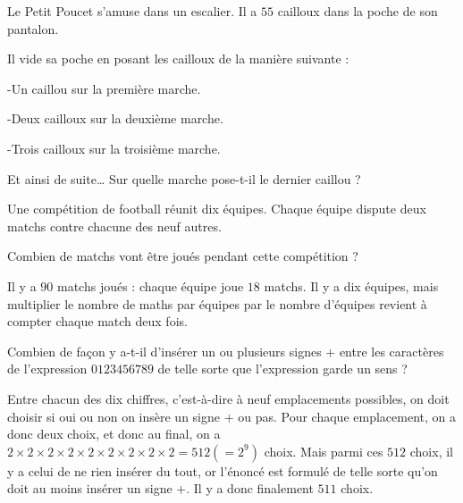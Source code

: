 \begin{exo}
Le Petit Poucet s’amuse dans un escalier. Il a $55$ cailloux dans la poche de son pantalon.

Il vide sa poche en posant les cailloux de la manière suivante :

-Un caillou sur la première marche.

-Deux cailloux sur la deuxième marche.

-Trois cailloux sur la troisième marche.

Et ainsi de suite… Sur quelle marche pose-t-il le dernier caillou ?
\end{exo}

\begin{exo}
Une compétition de football réunit dix équipes. Chaque équipe dispute deux matchs contre chacune des neuf autres.

Combien de matchs vont être joués pendant cette compétition ?
\begin{sol}
Il y a $90$ matchs joués : chaque équipe joue $18$ matchs. Il y a dix équipes, mais multiplier le nombre de maths par équipes par le nombre d'équipes revient à compter chaque match deux fois.
\end{sol} 
\end{exo}



\begin{exo}
Combien de façon y a-t-il d'insérer un ou plusieurs signes $+$ entre les caractères de l'expression $0123456789$ de telle sorte que l'expression garde un sens ?
\begin{sol}
Entre chacun des dix chiffres, c'est-à-dire à neuf emplacements possibles, on doit choisir si oui ou non on insère un signe $+$ ou pas. Pour chaque emplacement, on a donc deux choix, et donc au final, on a $2\times 2\times 2\times2\times2\times2\times2\times2\times 2 =512 (=2^9)$ choix. Mais parmi ces $512$ choix, il y a celui de ne rien insérer du tout, or l'énoncé est formulé de telle sorte qu'on doit au moins insérer un signe $+$. Il y a donc finalement $511$ choix.
\end{sol}
\end{exo}

